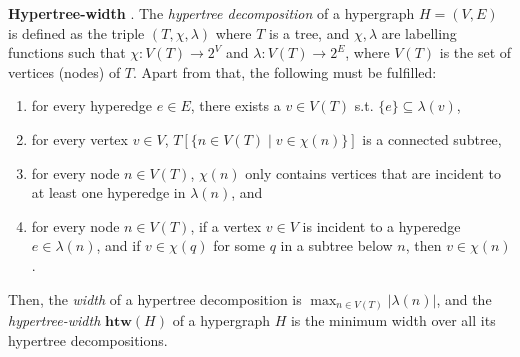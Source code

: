 \noindent
\textbf{Hypertree-width} \cite{DBLP:journals/siamcomp/GottlobP04}.
The {\em hypertree decomposition} of a hypergraph $H=(V,E)$ is defined as the triple $(T, \chi, \lambda)$ where $T$ is a tree, and $\chi, \lambda$ are labelling functions such that  $\chi : V(T) \rightarrow 2^V$ and $\lambda : V(T) \rightarrow 2^E$, where $V(T)$ is the set of vertices (nodes) of $T$.
Apart from that, the following must be fulfilled:
\begin{enumerate}
	\item for every hyperedge $e \in E$, there exists a $v \in V(T)$ s.t. $\{e\} \subseteq \lambda(v)$,
	\item for every vertex $v \in V$, $T[\{ n \in V(T) \; | \; v \in \chi(n) \}]$ is a connected subtree,
	\item for every node $n \in V(T)$, $\chi(n)$ only contains vertices that are incident to at least one hyperedge in $\lambda(n)$, and
	\item for every node $n \in V(T)$, if a vertex $v \in V$ is incident to a hyperedge $e \in \lambda(n)$, and if $v \in \chi(q)$ for some $q$ in a subtree below $n$, then $v\in \chi(n)$.
\end{enumerate}
Then, the {\em width} of a hypertree decomposition is $\max_{n \in V(T)} |\lambda(n)|$, and the {\em hypertree-width} $\mathbf{htw}(H)$ of a hypergraph $H$ is the minimum width over all its hypertree decompositions. \\

